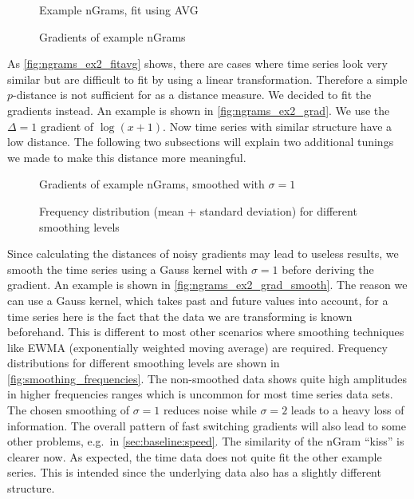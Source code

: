\begin{figure}
    \centering
    
    \caption{Example nGrams, fit using AVG}\label{fig:ngrams_ex2_fitavg}
\end{figure}

\begin{figure}
    \centering
    
    \caption{Gradients of example nGrams}\label{fig:ngrams_ex2_grad}
\end{figure}

As \autoref{fig:ngrams_ex2_fitavg} shows, there are cases where time series look very similar but are difficult to fit by using a linear transformation. Therefore a simple $p$-distance is not sufficient for as a distance measure. We decided to fit the gradients instead. An example is shown in \autoref{fig:ngrams_ex2_grad}. We use the $\Delta = 1$ gradient of $\log(x + 1)$. Now time series with similar structure have a low distance. The following two subsections will explain two additional tunings we made to make this distance more meaningful.

\begin{figure}
    \centering
    
    \caption{Gradients of example nGrams, smoothed with $\sigma = 1$}\label{fig:ngrams_ex2_grad_smooth}
\end{figure}

\begin{figure}
    \centering
    
    \caption{Frequency distribution (mean + standard deviation) for different smoothing levels}\label{fig:smoothing_frequencies}
\end{figure}

Since calculating the distances of noisy gradients may lead to useless results, we smooth the time series using a Gauss kernel with $\sigma = 1$ before deriving the gradient. An example is shown in \autoref{fig:ngrams_ex2_grad_smooth}. The reason we can use a Gauss kernel, which takes past and future values into account, for a time series here is the fact that the data we are transforming is known beforehand. This is different to most other scenarios where smoothing techniques like EWMA (exponentially weighted moving average) are required. Frequency distributions for different smoothing levels are shown in \autoref{fig:smoothing_frequencies}. The non-smoothed data shows quite high amplitudes in higher frequencies ranges which is uncommon for most time series data sets. The chosen smoothing of $\sigma = 1$ reduces noise while $\sigma = 2$ leads to a heavy loss of information. The overall pattern of fast switching gradients will also lead to some other problems, e.g.\ in \autoref{sec:baseline:speed}. The similarity of the nGram \enquote{kiss} is clearer now. As expected, the time data does not quite fit the other example series. This is intended since the underlying data also has a slightly different structure.


